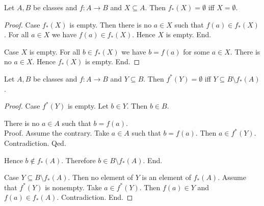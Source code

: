 \documentclass[10pt]{article}
\begin{document}
  \begin{forthel}
    \begin{proposition}[id=FOUNDATIONS_07_3318372355801088,printid]
      Let $A, B$ be classes and $f : A \to B$ and $X \subseteq A$.
      Then $f_{*}(X) = \emptyset$ iff $X = \emptyset$.
    \end{proposition}
    \begin{proof}
      Case $f_{*}(X)$ is empty.
        Then there is no $a \in X$ such that $f(a) \in f_{*}(X)$.
        For all $a \in X$ we have $f(a) \in f_{*}(X)$.
        Hence $X$ is empty.
      End.

      Case $X$ is empty.
        For all $b \in f_{*}(X)$ we have $b = f(a)$ for some $a \in X$.
        There is no $a \in X$.
        Hence $f_{*}(X)$ is empty.
      End.
    \end{proof}
  \end{forthel}

  \begin{forthel}
    \begin{proposition}[id=FOUNDATIONS_07_8597874786959360,printid]
      Let $A, B$ be classes and $f : A \to B$ and $Y \subseteq B$.
      Then $f^{*}(Y) = \emptyset$ iff $Y \subseteq B \setminus f_{*}(A)$.
    \end{proposition}
    \begin{proof}
      Case $f^{*}(Y)$ is empty.
        Let $b \in Y$.
        Then $b \in B$.

        There is no $a \in A$ such that $b = f(a)$. \\
        Proof.
          Assume the contrary.
          Take $a \in A$ such that $b = f(a)$.
          Then $a \in f^{*}(Y)$.
          Contradiction.
        Qed.

        Hence $b \notin f_{*}(A)$.
        Therefore $b \in B \setminus f_{*}(A)$.
      End.

      Case $Y \subseteq B \setminus f_{*}(A)$.
        Then no element of $Y$ is an element of $f_{*}(A)$.
        Assume that $f^{*}(Y)$ is nonempty.
        Take $a \in f^{*}(Y)$.
        Then $f(a) \in Y$ and $f(a) \in f_{*}(A)$.
        Contradiction.
      End.
    \end{proof}
  \end{forthel}
\end{document}
